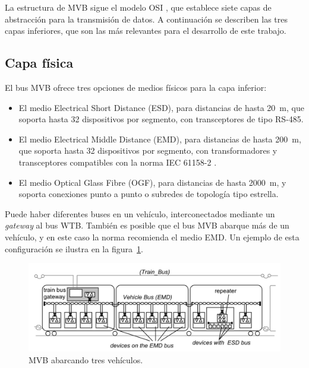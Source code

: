 La estructura de MVB sigue el modelo OSI \cite{ISO7498-1}, que establece siete capas de abstracción para la transmisión de datos. A continuación se describen las tres capas inferiores, que son las más relevantes para el desarrollo de este trabajo.

\subsection{Capa física}

El bus MVB ofrece tres opciones de medios físicos para la capa inferior:

\begin{itemize}
\item El medio Electrical Short Distance (ESD), para distancias de hasta 20~m, que soporta hasta 32 dispositivos por segmento, con transceptores de tipo RS-485.
\item El medio Electrical Middle Distance (EMD), para distancias de hasta 200~m, que soporta hasta  32 dispositivos por segmento, con transformadores y transceptores compatibles con la norma IEC 61158-2 \cite{iec61158_2}.
\item El medio Optical Glass Fibre (OGF), para distancias de hasta 2000~m, y soporta conexiones punto a punto o subredes de topología tipo estrella.
\end{itemize}

Puede haber diferentes buses en un vehículo, interconectados mediante un \textit{gateway} al bus WTB.
También es posible que el bus MVB abarque más de un vehículo, y en este caso la norma recomienda el medio EMD.
Un ejemplo de esta configuración se ilustra en la figura~\ref{fig:emd-esd-wtb}.

\begin{figure}[htbp]
	\centering
	\includegraphics[width=1\textwidth]{./Figures/tcn-emd-esd-wtb.png}
	\caption[MVB abarcando tres vehículos]{MVB abarcando tres vehículos.
        \\ }
    \label{fig:emd-esd-wtb}
\end{figure}


